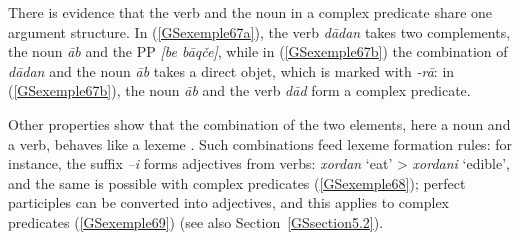 \documentclass[output=paper
                ,modfonts
                ,nonflat
	        ,collection
	        ,collectionchapter
	        ,collectiontoclongg
 	        ,biblatex
                ,babelshorthands
                ,newtxmath
                ,draftmode
                ,colorlinks, citecolor=brown
]{./langsci/langscibook}
\begin{document}
{    \label{GSexemple66b}
\zl

There is evidence that the verb and the noun in a complex predicate share one argument structure. In (\ref{GSexemple67a}), the verb \emph{d\=adan} takes two complements, the noun \emph{\=ab} and the PP \emph{[be b\=aq\v ce]}, while in (\ref{GSexemple67b}) the combination of \emph{d\=adan} and the noun \emph{\=ab} takes a direct objet, which is marked with \emph{-r\=a}: in (\ref{GSexemple67b}), the noun \emph{\=ab} and the verb \emph{d\=ad} form a complex predicate.  

\eal 
	\label{GSexemple67} 
    \label{GSexemple67a}
		
	\label{GSexemple67b}
\zl

Other properties show that the combination of the two elements, here a noun and a verb, behaves like a lexeme \citep{bonami2010persian}. Such combinations feed lexeme formation rules: for instance, the suffix \emph{–i} forms adjectives from verbs: \emph{xordan} `eat' > \emph{xordani} `edible', and the same is possible with complex predicates (\ref{GSexemple68}); perfect participles can be converted into adjectives, and this applies to complex predicates (\ref{GSexemple69}) (see also Section~\ref{GSsection5.2}).

\eal 
	\label{GSexemple68} 
    \label{GSexemple68a}
		
    \label{GSexemple68b}
\zl

}
\end{document}

